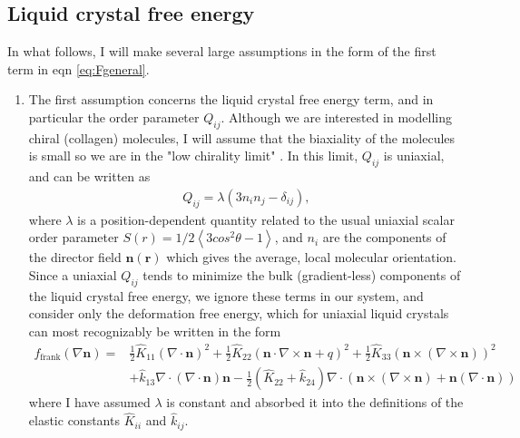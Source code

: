 \documentclass[12pt]{article}
\begin{document}
\subsection{Liquid crystal free energy}
In what follows, I will make several large assumptions in the form of the first term in eqn \ref{eq:Fgeneral}.
\begin{enumerate}[label=1.\alph*]
\item The first assumption concerns the liquid crystal free energy term, and in particular the order parameter $Q_{ij}$. Although we are interested in modelling chiral (collagen) molecules, I will assume that the biaxiality of the molecules is small so we are in the "low chirality limit" \cite{Wright:1989zz}. In this limit, $Q_{ij}$ is uniaxial, and can be written as
\begin{align}\label{eq:simpleQ}
Q_{ij}=\lambda(3n_in_j-\delta_{ij}),
\end{align}
where $\lambda$ is a position-dependent quantity related to the usual uniaxial scalar order parameter $S(r)=1/2\left<3cos^2\theta-1\right>$, and $n_i$ are the components of the director field $\bm{n}(\bm{r})$ which gives the average, local molecular orientation. Since a uniaxial $Q_{ij}$ tends to minimize the bulk (gradient-less) components of the liquid crystal free energy, we ignore these terms in our system, and consider only the deformation free energy, which for uniaxial liquid crystals can most recognizably be written in the form
\begin{align}
f_{\mathrm{frank}}(\nabla\bm{n})=&\frac{1}{2}\hat{K}_{11}(\nabla\cdot\bm{n})^2+\frac{1}{2}\hat{K}_{22}(\bm{n}\cdot\nabla\times\bm{n}+q)^2+\frac{1}{2}\hat{K}_{33}(\bm{n}\times(\nabla\times\bm{n}))^2\nonumber\\
&+\hat{k}_{13}\nabla\cdot(\nabla\cdot\bm{n})\bm{n}-\frac{1}{2}(\hat{K}_{22}+\hat{k}_{24})\nabla\cdot(\bm{n}\times(\nabla\times\bm{n})+\bm{n}(\nabla\cdot\bm{n}))
\end{align}
where I have assumed $\lambda$ is constant and absorbed it into the definitions of the elastic constants $\hat{K}_{ii}$ and $\hat{k}_{ij}$.


\end{enumerate}
\end{document}
